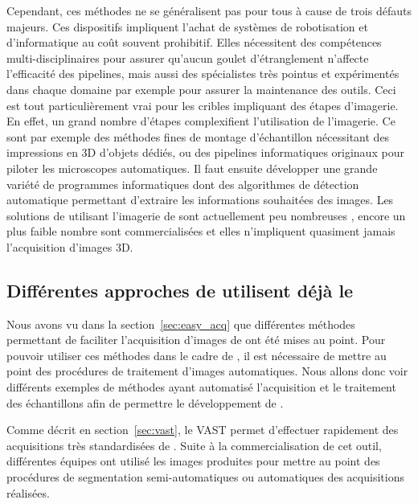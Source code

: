 \documentclass[\main/main.tex]{subfiles}
\begin{document}
%
Cependant, ces méthodes ne se généralisent pas pour tous à cause de trois défauts majeurs.
%
Ces dispositifs impliquent l'achat de systèmes de robotisation et d'informatique au coût souvent prohibitif. Elles nécessitent des compétences multi-disciplinaires pour assurer qu'aucun goulet d'étranglement n'affecte l'efficacité des pipelines, mais aussi des spécialistes très pointus et expérimentés dans chaque domaine par exemple pour assurer la maintenance des outils.
%
Ceci est tout particulièrement vrai pour les cribles impliquant des étapes d'imagerie.
%
En effet, un grand nombre d'étapes complexifient l'utilisation de l'imagerie. Ce sont par exemple des méthodes fines de montage d'échantillon nécessitant des impressions en 3D d'objets dédiés, ou des pipelines informatiques originaux pour piloter les microscopes automatiques. Il faut ensuite développer une grande variété de programmes informatiques dont des algorithmes de détection automatique permettant d'extraire les informations souhaitées des images.
%
Les solutions de \hcs{} utilisant l'imagerie de \pz{} sont actuellement peu nombreuses , encore un plus faible nombre sont commercialisées et elles n'impliquent quasiment jamais l'acquisition d'images 3D.
%
    \subsection{Différentes approches de \hcs{} utilisent déjà le \pz{}}

Nous avons vu dans la section~\ref{sec:easy_acq} que différentes méthodes permettant de faciliter l'acquisition d'images de \pz{}
ont été mises au point.
%
Pour pouvoir utiliser ces méthodes dans le cadre de \hcs{}, il est nécessaire de mettre au point des procédures de traitement d'images automatiques.
%
Nous allons donc voir différents exemples de méthodes ayant automatisé l'acquisition et le traitement des échantillons afin de permettre le développement de \hcs{}.


%
Comme décrit en section~\ref{sec:vast}, le VAST permet d'effectuer rapidement des acquisitions très standardisées de \pz{}.
%
Suite à la commercialisation de cet outil, différentes équipes ont utilisé les images produites pour mettre au point des procédures de segmentation semi-automatiques ou automatiques des acquisitions réalisées.
%
\end{document}
